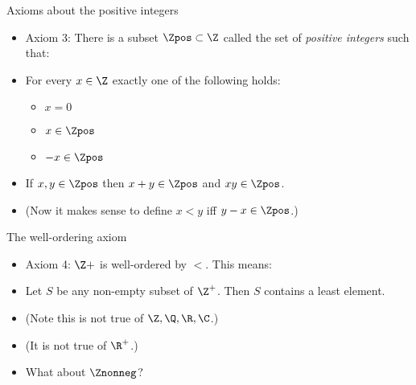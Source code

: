 \documentclass{beamer}
\begin{document}
\begin{frame}{Axioms about the positive integers}

\begin{itemize}
  \item Axiom 3: There is a subset $\Zpos\subset\Z$ called the set of \emph{positive integers} such that:
  \item For every $x\in\Z$ exactly one of the following holds:
    \begin{itemize}
      \item $x=0$
      \item $x\in\Zpos$
      \item $-x\in\Zpos$
    \end{itemize}
  \item If $x,y\in\Zpos$ then $x+y\in\Zpos$ and $xy\in\Zpos$.
  \item (Now it makes sense to define $x<y$ iff $y-x\in\Zpos$.)
\end{itemize}

\end{frame}

\begin{frame}{The well-ordering axiom}

\begin{itemize}
  \item Axiom 4: $\Z+$ is well-ordered by $<$. This means:
  \item Let $S$ be any non-empty subset of $\Z^+$. Then $S$ contains
  a least element.
  \item (Note this is not true of $\Z,\Q,\R,\C$.)
  \item (It is not true of $\R^+$.)
  \item What about $\Znonneg$?
\end{itemize}

\end{frame}
\end{document}
